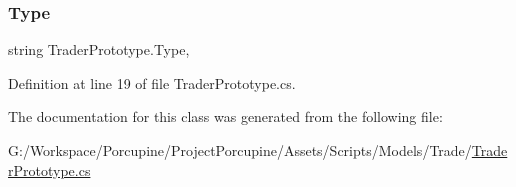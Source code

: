 \subsubsection{\texorpdfstring{Type}{Type}}
{\footnotesize\ttfamily string Trader\+Prototype.\+Type\hspace{0.3cm}{\ttfamily [get]}, {\ttfamily [set]}}



Definition at line 19 of file Trader\+Prototype.\+cs.



The documentation for this class was generated from the following file\+:\begin{DoxyCompactItemize}
\item 
G\+:/\+Workspace/\+Porcupine/\+Project\+Porcupine/\+Assets/\+Scripts/\+Models/\+Trade/\hyperlink{_trader_prototype_8cs}{Trader\+Prototype.\+cs}\end{DoxyCompactItemize}
